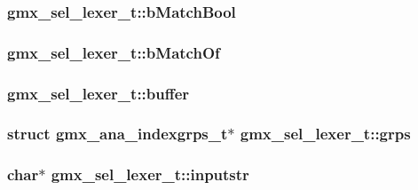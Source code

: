 \hypertarget{structgmx__sel__lexer__t_ac47027c17defa2481ad1ad148e2cc498}{
\subsubsection[{b\-Match\-Bool}]{ {\bf gmx\-\_\-sel\-\_\-lexer\-\_\-t\-::b\-Match\-Bool}}}\label{structgmx__sel__lexer__t_ac47027c17defa2481ad1ad148e2cc498}
\hypertarget{structgmx__sel__lexer__t_a4e7e63780f49f05cf29a6df70971925d}{
\subsubsection[{b\-Match\-Of}]{ {\bf gmx\-\_\-sel\-\_\-lexer\-\_\-t\-::b\-Match\-Of}}}\label{structgmx__sel__lexer__t_a4e7e63780f49f05cf29a6df70971925d}
\hypertarget{structgmx__sel__lexer__t_a705f00803cda152ad8a26aebda19b2c2}{
\subsubsection[{buffer}]{ {\bf gmx\-\_\-sel\-\_\-lexer\-\_\-t\-::buffer}}}\label{structgmx__sel__lexer__t_a705f00803cda152ad8a26aebda19b2c2}
\hypertarget{structgmx__sel__lexer__t_aef870a37623dcafbd547da645d16f891}{
\subsubsection[{grps}]{\setlength{\rightskip}{0pt plus 5cm}struct {\bf gmx\-\_\-ana\-\_\-indexgrps\-\_\-t}$\ast$ {\bf gmx\-\_\-sel\-\_\-lexer\-\_\-t\-::grps}}}\label{structgmx__sel__lexer__t_aef870a37623dcafbd547da645d16f891}
\hypertarget{structgmx__sel__lexer__t_a3d8591710e5e07602dcbc1d2b511661e}{
\subsubsection[{inputstr}]{\setlength{\rightskip}{0pt plus 5cm}char$\ast$ {\bf gmx\-\_\-sel\-\_\-lexer\-\_\-t\-::inputstr}}}\label{structgmx__sel__lexer__t_a3d8591710e5e07602dcbc1d2b511661e}
